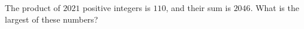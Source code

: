 The product of $2021$ positive integers is $110$, and their sum is $2046$. What is the largest of these numbers?

